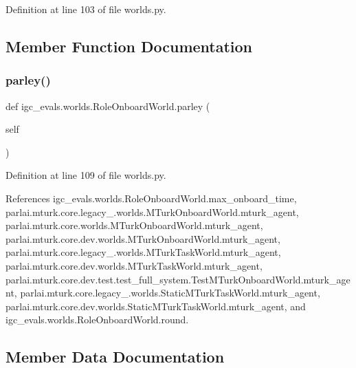 Definition at line 103 of file worlds.\+py.



\subsection{Member Function Documentation}
\mbox{\label{classigc__evals_1_1worlds_1_1RoleOnboardWorld_a84185551f87f342eb5aa827e6d4bc520}} 
\subsubsection{\texorpdfstring{parley()}{parley()}}
{\footnotesize\ttfamily def igc\+\_\+evals.\+worlds.\+Role\+Onboard\+World.\+parley (\begin{DoxyParamCaption}\item[{}]{self }\end{DoxyParamCaption})}



Definition at line 109 of file worlds.\+py.



References igc\+\_\+evals.\+worlds.\+Role\+Onboard\+World.\+max\+\_\+onboard\+\_\+time, parlai.\+mturk.\+core.\+legacy\+\_.\+worlds.\+M\+Turk\+Onboard\+World.\+mturk\+\_\+agent, parlai.\+mturk.\+core.\+worlds.\+M\+Turk\+Onboard\+World.\+mturk\+\_\+agent, parlai.\+mturk.\+core.\+dev.\+worlds.\+M\+Turk\+Onboard\+World.\+mturk\+\_\+agent, parlai.\+mturk.\+core.\+legacy\+\_.\+worlds.\+M\+Turk\+Task\+World.\+mturk\+\_\+agent, parlai.\+mturk.\+core.\+dev.\+worlds.\+M\+Turk\+Task\+World.\+mturk\+\_\+agent, parlai.\+mturk.\+core.\+dev.\+test.\+test\+\_\+full\+\_\+system.\+Test\+M\+Turk\+Onboard\+World.\+mturk\+\_\+agent, parlai.\+mturk.\+core.\+legacy\+\_.\+worlds.\+Static\+M\+Turk\+Task\+World.\+mturk\+\_\+agent, parlai.\+mturk.\+core.\+dev.\+worlds.\+Static\+M\+Turk\+Task\+World.\+mturk\+\_\+agent, and igc\+\_\+evals.\+worlds.\+Role\+Onboard\+World.\+round.



\subsection{Member Data Documentation}
\mbox{\label{classigc__evals_1_1worlds_1_1RoleOnboardWorld_a5746dc1a7d35c4a525c8fd2f5f20e149}} 
